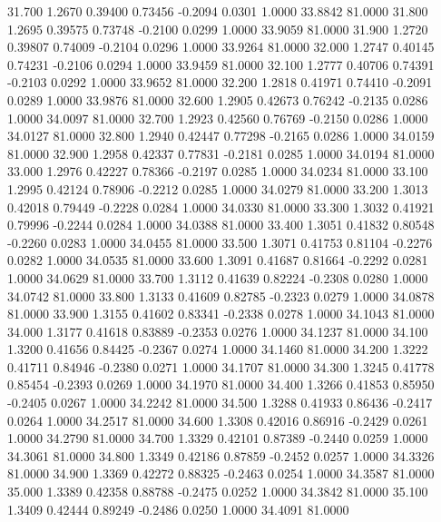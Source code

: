   31.700   1.2670   0.39400   0.73456  -0.2094   0.0301   1.0000  33.8842  81.0000
  31.800   1.2695   0.39575   0.73748  -0.2100   0.0299   1.0000  33.9059  81.0000
  31.900   1.2720   0.39807   0.74009  -0.2104   0.0296   1.0000  33.9264  81.0000
  32.000   1.2747   0.40145   0.74231  -0.2106   0.0294   1.0000  33.9459  81.0000
  32.100   1.2777   0.40706   0.74391  -0.2103   0.0292   1.0000  33.9652  81.0000
  32.200   1.2818   0.41971   0.74410  -0.2091   0.0289   1.0000  33.9876  81.0000
  32.600   1.2905   0.42673   0.76242  -0.2135   0.0286   1.0000  34.0097  81.0000
  32.700   1.2923   0.42560   0.76769  -0.2150   0.0286   1.0000  34.0127  81.0000
  32.800   1.2940   0.42447   0.77298  -0.2165   0.0286   1.0000  34.0159  81.0000
  32.900   1.2958   0.42337   0.77831  -0.2181   0.0285   1.0000  34.0194  81.0000
  33.000   1.2976   0.42227   0.78366  -0.2197   0.0285   1.0000  34.0234  81.0000
  33.100   1.2995   0.42124   0.78906  -0.2212   0.0285   1.0000  34.0279  81.0000
  33.200   1.3013   0.42018   0.79449  -0.2228   0.0284   1.0000  34.0330  81.0000
  33.300   1.3032   0.41921   0.79996  -0.2244   0.0284   1.0000  34.0388  81.0000
  33.400   1.3051   0.41832   0.80548  -0.2260   0.0283   1.0000  34.0455  81.0000
  33.500   1.3071   0.41753   0.81104  -0.2276   0.0282   1.0000  34.0535  81.0000
  33.600   1.3091   0.41687   0.81664  -0.2292   0.0281   1.0000  34.0629  81.0000
  33.700   1.3112   0.41639   0.82224  -0.2308   0.0280   1.0000  34.0742  81.0000
  33.800   1.3133   0.41609   0.82785  -0.2323   0.0279   1.0000  34.0878  81.0000
  33.900   1.3155   0.41602   0.83341  -0.2338   0.0278   1.0000  34.1043  81.0000
  34.000   1.3177   0.41618   0.83889  -0.2353   0.0276   1.0000  34.1237  81.0000
  34.100   1.3200   0.41656   0.84425  -0.2367   0.0274   1.0000  34.1460  81.0000
  34.200   1.3222   0.41711   0.84946  -0.2380   0.0271   1.0000  34.1707  81.0000
  34.300   1.3245   0.41778   0.85454  -0.2393   0.0269   1.0000  34.1970  81.0000
  34.400   1.3266   0.41853   0.85950  -0.2405   0.0267   1.0000  34.2242  81.0000
  34.500   1.3288   0.41933   0.86436  -0.2417   0.0264   1.0000  34.2517  81.0000
  34.600   1.3308   0.42016   0.86916  -0.2429   0.0261   1.0000  34.2790  81.0000
  34.700   1.3329   0.42101   0.87389  -0.2440   0.0259   1.0000  34.3061  81.0000
  34.800   1.3349   0.42186   0.87859  -0.2452   0.0257   1.0000  34.3326  81.0000
  34.900   1.3369   0.42272   0.88325  -0.2463   0.0254   1.0000  34.3587  81.0000
  35.000   1.3389   0.42358   0.88788  -0.2475   0.0252   1.0000  34.3842  81.0000
  35.100   1.3409   0.42444   0.89249  -0.2486   0.0250   1.0000  34.4091  81.0000
